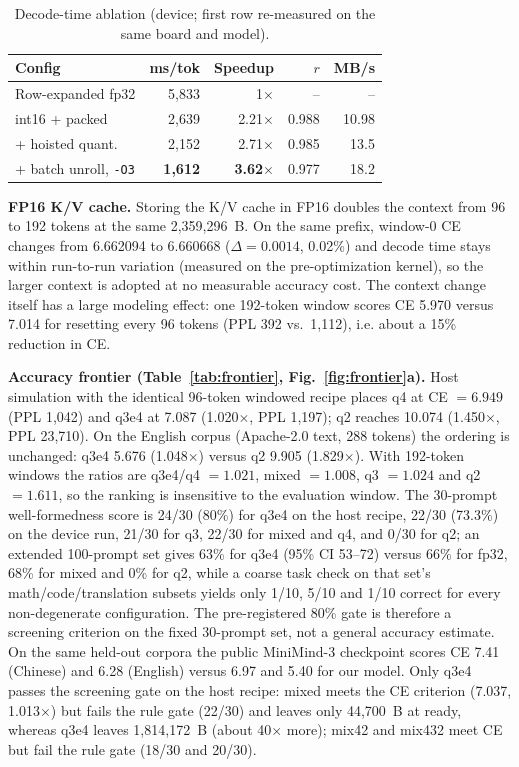 \documentclass[journal,letterpaper]{IEEEtran}
\begin{document}
\begin{table}[t]
\centering
\caption{Decode-time ablation (device; first row re-measured on the same board and model).}
\label{tab:gemv}
\footnotesize
\setlength{\tabcolsep}{2.5pt}
\begin{tabular}{@{}lrrrr@{}}
\toprule
Config & ms/tok & Speedup & $r$ & MB/s \\
\midrule
Row-expanded fp32 & 5,833 & 1$\times$ & -- & -- \\
int16 + packed & 2,639 & 2.21$\times$ & 0.988 & 10.98 \\
+ hoisted quant. & 2,152 & 2.71$\times$ & 0.985 & 13.5 \\
+ batch unroll, \texttt{-O3} & \textbf{1,612} & \textbf{3.62$\times$} & 0.977 & 18.2 \\
\bottomrule
\end{tabular}
\end{table}

\textbf{FP16 K/V cache.} Storing the K/V cache in FP16 doubles the context from 96 to 192
tokens at the same 2,359,296~B. On the same prefix, window-0 CE changes from 6.662094 to
6.660668 ($\Delta=0.0014$, 0.02\%) and decode time stays within run-to-run variation (measured
on the pre-optimization kernel), so the larger context is adopted at no measurable accuracy
cost. The context change itself has a large modeling effect: one 192-token window scores CE
5.970 versus 7.014 for resetting every 96 tokens (PPL 392 vs.\ 1,112), i.e. about a 15\%
reduction in CE.

\textbf{Accuracy frontier (Table~\ref{tab:frontier}, Fig.~\ref{fig:frontier}a).} Host
simulation with the identical 96-token windowed recipe places q4 at CE $=6.949$ (PPL 1,042) and
q3e4 at 7.087 (1.020$\times$, PPL 1,197); q2 reaches 10.074 (1.450$\times$, PPL 23,710). On
the English corpus (Apache-2.0 text, 288 tokens) the ordering is unchanged: q3e4 5.676
(1.048$\times$) versus q2 9.905 (1.829$\times$). With 192-token windows the ratios are
q3e4/q4 $=1.021$, mixed $=1.008$, q3 $=1.024$ and q2 $=1.611$, so the ranking is insensitive to
the evaluation window. The 30-prompt well-formedness score is 24/30 (80\%) for q3e4 on the host
recipe, 22/30 (73.3\%) on the device run, 21/30 for q3, 22/30 for mixed and q4, and 0/30 for q2;
an extended 100-prompt set gives 63\% for q3e4 (95\% CI 53--72) versus 66\% for fp32, 68\% for
mixed and 0\% for q2, while a coarse task check on that set's math/code/translation subsets
yields only 1/10, 5/10 and 1/10 correct for every non-degenerate configuration. The
pre-registered 80\% gate is therefore a screening criterion on the fixed 30-prompt set, not a
general accuracy estimate. On the same held-out corpora the public MiniMind-3 checkpoint scores
CE 7.41 (Chinese) and 6.28 (English) versus 6.97 and 5.40 for our model. Only q3e4 passes the
screening gate on the host recipe: mixed meets the CE criterion (7.037, 1.013$\times$) but fails
the rule gate (22/30) and leaves only 44,700~B at ready, whereas q3e4 leaves 1,814,172~B (about
40$\times$ more); mix42 and mix432 meet CE but fail the rule gate (18/30 and 20/30).
\end{document}
